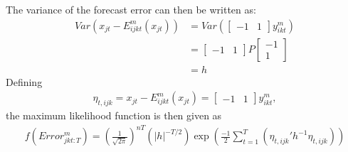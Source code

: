 The variance of the forecast error can then be written as:
\begin{align*}
	Var( x_{jt}- E_{ijkt}^m(x_{jt})) & = Var\left( \begin{bmatrix}
		-1 & 1
	\end{bmatrix}  y_{ikt}^m \right)\\
& =  \begin{bmatrix}
	-1 & 1
\end{bmatrix}  P  \begin{bmatrix}
-1 \\ 1
\end{bmatrix}  \\
& = h
\end{align*}
Defining
\begin{align*}
	\eta_{t, ijk}= x_{jt}- E_{ijkt}^m(x_{jt}) = \begin{bmatrix}
		-1 & 1
	\end{bmatrix}  y_{ikt}^m  , 
\end{align*}
the maximum likelihood function is then given as
\begin{align*}
	f(Error_{jkt:T}^m) = \left(\frac{1}{\sqrt{2\pi}}\right)^{nT} \left(|	 h |^{-T/2}  \right) \exp \left(   \frac{-1}{2} \sum_{t=1}^{T} (\eta_{t, ijk}' h^{-1} \eta_{t, ijk})\right)
\end{align*}


